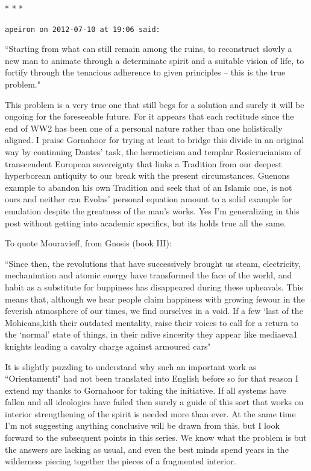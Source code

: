 \hfill




\begin{center}* * *\end{center}

\begin{footnotesize}\begin{sffamily}



\texttt{apeiron on 2012-07-10 at 19:06 said: }

``Starting from what can still remain among the ruins, to reconstruct slowly a new man to animate through a determinate spirit and a suitable vision of life, to fortify through the tenacious adherence to given principles – this is the true problem."

This problem is a very true one that still begs for a solution and surely it will be ongoing for the foreseeable future. For it appears that each rectitude since the end of WW2 has been one of a personal nature rather than one holistically aligned. I praise Gornahoor for trying at least to bridge this divide in an original way by continuing Dantes' task, the hermeticism and templar Rosicrucianism of transcendent European sovereignty that links a Tradition from our deepest hyperborean antiquity to our break with the present circumstances. Guenons example to abandon his own Tradition and seek that of an Islamic one, is not ours and neither can Evolas' personal equation amount to a solid example for emulation despite the greatness of the man's works. Yes I'm generalizing in this post without getting into academic specifics, but its holds true all the same.

To quote Mouravieff, from Gnosis (book III):

``Since then, the revolutions that have successively brought us steam, electricity, mechanimtion and atomic energy have transformed the face of the world, and habit as a substitute for buppiness has disappeared during these upheavals. This means that, although we hear people claim happiness with growing fewour in the feverish atmosphere of our times, we find ourselves in a void. If a few `last of the Mohicans,kith their outdated mentality, raise their voices to call for a return to the `normal' state of things, in their ndive sincerity they appear like mediaeva1 knights leading a cavalry charge against armoured cars" 

It is slightly puzzling to understand why such an important work as ``Orientamenti" had not been translated into English before so for that reason I extend my thanks to Gornahoor for taking the initiative. If all systems have fallen and all ideologies have failed then surely a guide of this sort that works on interior strengthening of the spirit is needed more than ever. At the same time I'm not suggesting anything conclusive will be drawn from this, but I look forward to the subsequent points in this series. We know what the problem is but the answers are lacking as usual, and even the best minds spend years in the wilderness piecing together the pieces of a fragmented interior.



\end{sffamily}
\end{footnotesize}
